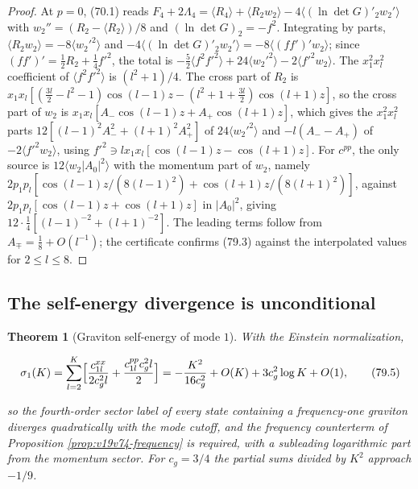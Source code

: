 \documentclass[11pt]{article}
\newtheorem{theorem}{Theorem}[section]
\theoremstyle{remark}
\begin{document}
\begin{proof}
At \(p=0\), (70.1) reads
\(F_4+2\Lambda_4=\langle R_4\rangle+\langle R_2w_2\rangle-4\langle(\ln\det G)'_2w_2'\rangle\)
with \(w_2''=(R_2-\langle R_2\rangle)/8\) and \((\ln\det G)_2=-f^2\).
Integrating by parts, \(\langle R_2w_2\rangle=-8\langle w_2'^2\rangle\)
and \(-4\langle(\ln\det G)'_2w_2'\rangle=-8\langle(ff')'w_2\rangle\);
since \((ff')'=\tfrac12R_2+\tfrac14f'^2\), the total is
\(-\tfrac52\langle f^2f'^2\rangle+24\langle w_2'^2\rangle-2\langle f'^2w_2\rangle\).
The \(x_1^2x_l^2\) coefficient of \(\langle f^2f'^2\rangle\) is
\((l^2+1)/4\).  The cross part of \(R_2\) is
\(x_1x_l[(\tfrac{3l}2-l^2-1)\cos(l-1)z-(l^2+1+\tfrac{3l}2)\cos(l+1)z]\),
so the cross part of \(w_2\) is \(x_1x_l[A_-\cos(l-1)z+A_+\cos(l+1)z]\),
which gives the \(x_1^2x_l^2\) parts \(12[(l-1)^2A_-^2+(l+1)^2A_+^2]\)
of \(24\langle w_2'^2\rangle\) and \(-l(A_--A_+)\) of
\(-2\langle f'^2w_2\rangle\), using
\(f'^2\ni lx_1x_l[\cos(l-1)z-\cos(l+1)z]\).  For \(c^{pp}\), the only
source is \(12\langle w_2|A_0|^2\rangle\) with the momentum part of
\(w_2\), namely \(2p_1p_l[\cos(l-1)z/(8(l-1)^2)+\cos(l+1)z/(8(l+1)^2)]\),
against \(2p_1p_l[\cos(l-1)z+\cos(l+1)z]\) in \(|A_0|^2\), giving
\(12\cdot\tfrac14[(l-1)^{-2}+(l+1)^{-2}]\).  The leading terms follow
from \(A_\mp=\tfrac18+O(l^{-1})\); the certificate confirms (79.3)
against the interpolated values for \(2\leq l\leq8\).
\end{proof}

\subsection{The self-energy divergence is unconditional}

\begin{theorem}[Graviton self-energy of mode \(1\)]
\label{thm:v19v76-self-energy}
With the Einstein normalization,

\[
 \sigma_1(K)=\sum_{l=2}^K\Bigl[\frac{c^{xx}_{1l}}{2c_g^2l}+\frac{c^{pp}_{1l}c_g^2l}2\Bigr]
 =-\frac{K^2}{16c_g^2}+O(K)+3c_g^2\log K+O(1),                            \tag{79.5}
\]

so the fourth-order sector label of every state containing a
frequency-one graviton diverges quadratically with the mode cutoff,
and the frequency counterterm of Proposition
\ref{prop:v19v74-frequency} is required, with a subleading
logarithmic part from the momentum sector.  For \(c_g=3/4\) the
partial sums divided by \(K^2\) approach \(-1/9\).
\end{theorem}
\end{document}
